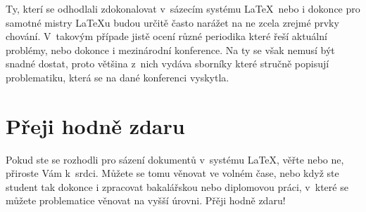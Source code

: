 \documentclass[a4paper,11pt,titlepage]{article}
\begin{document}
Ty, kterí se odhodlali zdokonalovat v~sázecím systému \LaTeX \  nebo i dokonce pro samotné mistry \LaTeX u budou určitě často narážet na ne zcela zrejmé prvky chování. V~takovým případe jistě ocení různé periodika \cite{Springer:Book_Reviews} které řeší aktuální problémy, nebo dokonce i mezinárodní konference. Na ty se však nemusí být snadné dostat, proto většina z~nich vydáva sborníky \cite{TeX_conf:Proc} které stručně popisují problematiku, která se na dané konferenci vyskytla. 

\section{Přeji hodně zdaru}
Pokud ste se rozhodli pro sázení dokumentů v~systému \LaTeX, věřte nebo ne, přiroste Vám k~srdci. Můžete se tomu věnovat ve volném čase, nebo když ste student tak dokonce i zpracovat bakalářskou \cite{Simek:Transformace_vyrazu} nebo diplomovou \cite{Lebeda:Interpret_jazyka_LaTeX} práci, v~které se můžete problematice věnovat na vyšší úrovni. \break
Přěji hodně zdaru!


\newpage

\end{document}
